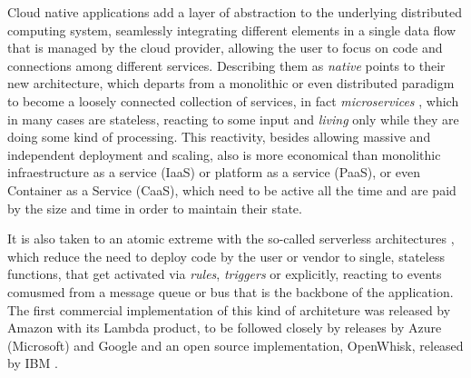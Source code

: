 \documentclass[sigconf]{acmart}
\begin{document}
  Cloud native applications add a layer of abstraction to the
  underlying distributed computing system, seamlessly integrating
  different elements in a single data flow that is managed by the
  cloud provider, allowing the user to focus on code and connections
  among different services. Describing them as {\em native} points
  to their new architecture, which departs from a monolithic or even
  distributed paradigm to become a loosely connected collection of
  services, in fact {\em microservices} \cite{microservices}, which in many cases are stateless, reacting to some input and
  {\em living} only while they are doing some kind of processing. This
  reactivity, besides allowing massive and independent deployment and
  scaling, also is more economical than monolithic infraestructure as
  a service (IaaS) or platform as a service (PaaS), or even Container
  as a Service (CaaS), which need to be active all the time and are
  paid by the size and time in order to maintain their state.

  It is also taken to an atomic extreme
  with the so-called serverless architectures \cite{Varghese2018849},
  which reduce the need to deploy code by the user or vendor to single, stateless
  functions, that get activated via {\em rules}, {\em triggers} or
  explicitly, reacting to events comusmed from
  a message queue or bus that
  is the backbone of the application. The first commercial
  implementation of this kind of architeture was released by Amazon
  with its Lambda product, to be followed closely by releases by Azure
  (Microsoft) and Google and an open source implementation, OpenWhisk,
  released by IBM \cite{Baldini2016287}.
\end{document}
